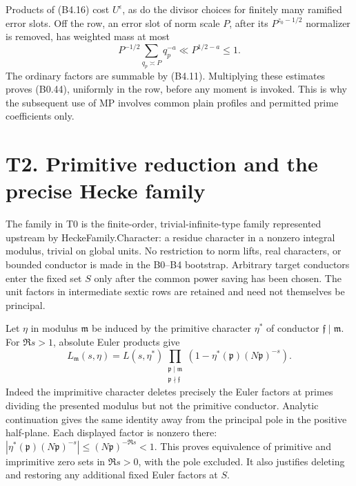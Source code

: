 \documentclass[11pt,a4paper]{article}
\newcommand{\sourcecode}[1]{{\small\ttfamily #1}}
\begin{document}
Products of (B4.16) cost \(U^\epsilon\), as do the divisor choices for
finitely many ramified error slots. Off the row, an error slot of norm
scale \(P\), after its \(P^{z_0-1/2}\) normalizer is removed, has
weighted mass at most \[
P^{-1/2}\sum_{q_p\asymp P}q_p^{-a}\ll P^{1/2-a}\le1.
\tag{B4.17}
\] The ordinary factors are summable by (B4.11). Multiplying these
estimates proves (B0.44), uniformly in the row, before any moment is
invoked. This is why the subsequent use of MP involves common plain
profiles and permitted prime coefficients only.

\hypertarget{t2.-primitive-reduction-and-the-precise-hecke-family}{%
\section{T2. Primitive reduction and the precise Hecke
family}\label{t2.-primitive-reduction-and-the-precise-hecke-family}}

The family in T0 is the finite-order, trivial-infinite-type family
represented upstream by \sourcecode{Hecke\allowbreak{}Family.\allowbreak{}Character}: a residue
character in a nonzero integral modulus, trivial on global units. No
restriction to norm lifts, real characters, or bounded conductor is made
in the B0--B4 bootstrap. Arbitrary target conductors enter the fixed set
\(S\) only after the common power saving has been chosen. The unit
factors in intermediate sextic rows are retained and need not themselves
be principal.

Let \(\eta\) in modulus \(\mathfrak m\) be induced by the primitive
character \(\eta^*\) of conductor \(\mathfrak f\mid\mathfrak m\). For
\(\Re s>1\), absolute Euler products give \[
L_{\mathfrak m}(s,\eta)=L(s,\eta^*)
\prod_{\substack{\mathfrak p\mid\mathfrak m\\\mathfrak p\nmid\mathfrak f}}
\left(1-\eta^*(\mathfrak p)(N\mathfrak p)^{-s}\right).
\tag{T2.1}
\] Indeed the imprimitive character deletes precisely the Euler factors
at primes dividing the presented modulus but not the primitive
conductor. Analytic continuation gives the same identity away from the
principal pole in the positive half-plane. Each displayed factor is
nonzero there:
\(|\eta^*(\mathfrak p)(N\mathfrak p)^{-s}|\le(N\mathfrak p)^{-\Re s}<1\).
This proves equivalence of primitive and imprimitive zero sets in
\(\Re s>0\), with the pole excluded. It also justifies deleting and
restoring any additional fixed Euler factors at \(S\).
\end{document}
